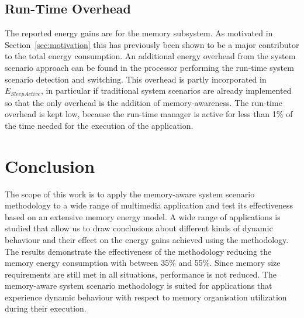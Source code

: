 \documentclass[smallextended]{svjour3}
\begin{document}
\subsection{Run-Time Overhead}  

The reported energy gains are for the memory subsystem. 
As motivated in Section~\ref{sec:motivation} this has previously been shown to be a major contributor to the total energy consumption. 
An additional energy overhead from the system scenario approach can be found in the processor performing the run-time system scenario detection and switching. 
This overhead is partly incorporated in $E_{SleepActive}$, in particular if traditional system scenarios are already implemented so that the only overhead is the addition of memory-awareness.
The run-time overhead is kept low, because the run-time manager is active for less than 1\% of the time needed for the execution of the application. 

\section{Conclusion}
\label{sec:conclusion}

The scope of this work is to apply the memory-aware system scenario methodology to a wide range of multimedia application and test its effectiveness based on an extensive memory energy model. 
A wide range of applications is studied that allow us to draw conclusions about different kinds of dynamic behaviour and their effect on the energy gains achieved using the methodology. 
The results demonstrate the effectiveness of the methodology reducing the memory energy consumption with between 35\% and 55\%. 
Since memory size requirements are still met in all situations, performance is not reduced. 
The memory-aware system scenario methodology is suited for applications that experience dynamic behaviour with respect to memory organisation utilization during their execution.
\end{document}

